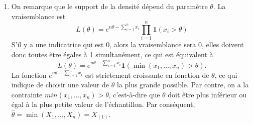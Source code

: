 \begin{exercice}
\begin{sol}
\begin{enumerate}
    \item On remarque que le support de la densité dépend du paramètre
      $\theta$. La vraisemblance est
      \begin{equation*}
        L(\theta) = e^{n\theta - \sum_{i=1}^n x_i}\prod_{i=1}^n\mathbf{1}(x_i>\theta)
      \end{equation*}
      S'il y a une indicatrice qui est 0, alors la vraisemblance sera 0, elles doivent donc toutes être égales à 1 simultanément, ce qui est équivalent à
      \begin{equation*}
        L(\theta) = e^{n\theta - \sum_{i=1}^n x_i}\mathbf{1}(\min(x_1,\ldots,x_n)>\theta).
      \end{equation*}
      La fonction $e^{n\theta - \sum_{i=1}^n x_i}$ est strictement
      croissante en fonction de $\theta$, ce qui indique de choisir
      une valeur de $\theta$ la plus grande possible. Par contre, on a
      la contrainte $min(x_1,\ldots,x_n)>\theta$, c'est-à-dire que $\theta$ doit
      être plus inférieur ou égal à la plus petite valeur de
      l'échantillon. Par conséquent, $\hat{\theta} = \min(X_1, \dots,
      X_n) = X_{(1)}$.
    \end{enumerate}
  \end{sol}
\end{exercice}

